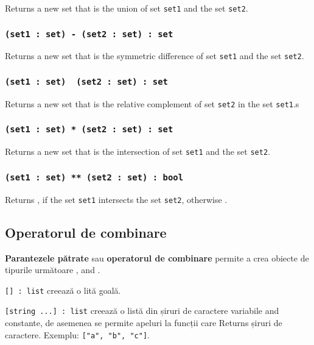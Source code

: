 Returns a new set that is the union of set \texttt{set1} and the set \texttt{set2}.

\subsubsection{\texttt{(set1 : set) - (set2 : set) : set}}

Returns a new set that is the symmetric difference of set \texttt{set1} and the set \texttt{set2}.

\subsubsection{\texttt{(set1 : set) \ (set2 : set) : set}}

Returns a new set that is the relative complement of set \texttt{set2} in the set \texttt{set1}.s

\subsubsection{\texttt{(set1 : set) * (set2 : set) : set}}

Returns a new set that is the intersection of set \texttt{set1} and the set \texttt{set2}.

\subsubsection{\texttt{(set1 : set) ** (set2 : set) : bool}}

Returns \true, if the set \texttt{set1} intersects the set \texttt{set2}, otherwise \false.

\subsection{Operatorul de combinare}

{\bf Parantezele pătrate} sau {\bf operatorul de combinare} permite a crea obiecte de tipurile următoare \listtype{}, \set{} and \object{}.

\texttt{[] : list} creează o lită goală.

\texttt{[string ...] : list} creează o listă din șiruri de caractere variabile and constante, de asemenea se permite apeluri la funcții care Returns șiruri de caractere. Exemplu: \texttt{["a", "b", "c"]}.

